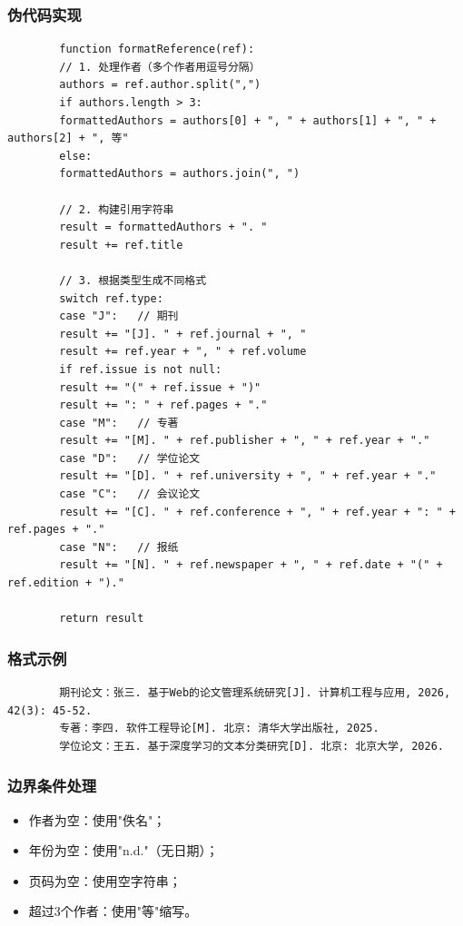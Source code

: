 \documentclass{../template/softeng}
\begin{document}
	\subsubsection{伪代码实现}
	\begin{verbatim}
		function formatReference(ref):
		// 1. 处理作者（多个作者用逗号分隔）
		authors = ref.author.split(",")
		if authors.length > 3:
		formattedAuthors = authors[0] + ", " + authors[1] + ", " + authors[2] + ", 等"
		else:
		formattedAuthors = authors.join(", ")

		// 2. 构建引用字符串
		result = formattedAuthors + ". "
		result += ref.title

		// 3. 根据类型生成不同格式
		switch ref.type:
		case "J":   // 期刊
		result += "[J]. " + ref.journal + ", "
		result += ref.year + ", " + ref.volume
		if ref.issue is not null:
		result += "(" + ref.issue + ")"
		result += ": " + ref.pages + "."
		case "M":   // 专著
		result += "[M]. " + ref.publisher + ", " + ref.year + "."
		case "D":   // 学位论文
		result += "[D]. " + ref.university + ", " + ref.year + "."
		case "C":   // 会议论文
		result += "[C]. " + ref.conference + ", " + ref.year + ": " + ref.pages + "."
		case "N":   // 报纸
		result += "[N]. " + ref.newspaper + ", " + ref.date + "(" + ref.edition + ")."

		return result
	\end{verbatim}

	\subsubsection{格式示例}
	\begin{verbatim}
		期刊论文：张三. 基于Web的论文管理系统研究[J]. 计算机工程与应用, 2026, 42(3): 45-52.
		专著：李四. 软件工程导论[M]. 北京: 清华大学出版社, 2025.
		学位论文：王五. 基于深度学习的文本分类研究[D]. 北京: 北京大学, 2026.
	\end{verbatim}

	\subsubsection{边界条件处理}
	\begin{itemize}
		\item 作者为空：使用"佚名"；
		\item 年份为空：使用"n.d."（无日期）；
		\item 页码为空：使用空字符串；
		\item 超过3个作者：使用"等"缩写。
	\end{itemize}
\end{document}
